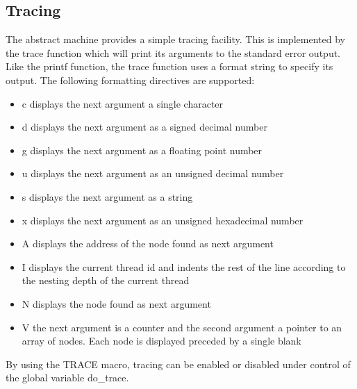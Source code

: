 %
%
\subsection{Tracing}
The abstract machine provides a simple tracing facility. This is
implemented by the {\Tt{}trace\nwendquote} function which will print its arguments
to the standard error output. Like the {\Tt{}printf\nwendquote} function, the
{\Tt{}trace\nwendquote} function uses a format string to specify its output. The
following formatting directives are supported:
\begin{itemize}
\item {\Tt{}{\%}c\nwendquote} displays the next argument a single character
\item {\Tt{}{\%}d\nwendquote} displays the next argument as a signed decimal number
\item {\Tt{}{\%}g\nwendquote} displays the next argument as a floating point number
\item {\Tt{}{\%}u\nwendquote} displays the next argument as an unsigned decimal number
\item {\Tt{}{\%}s\nwendquote} displays the next argument as a string
\item {\Tt{}{\%}x\nwendquote} displays the next argument as an unsigned hexadecimal number
\item {\Tt{}{\%}A\nwendquote} displays the address of the node found as next argument
\item {\Tt{}{\%}I\nwendquote} displays the current thread id and indents the rest of
  the line according to the nesting depth of the current thread
\item {\Tt{}{\%}N\nwendquote} displays the node found as next argument
\item {\Tt{}{\%}V\nwendquote} the next argument is a counter and the second argument a
  pointer to an array of nodes. Each node is displayed preceded by a
  single blank
\end{itemize}

By using the {\Tt{}TRACE\nwendquote} macro, tracing can be enabled or disabled under
control of the global variable {\Tt{}do{\_}trace\nwendquote}.


